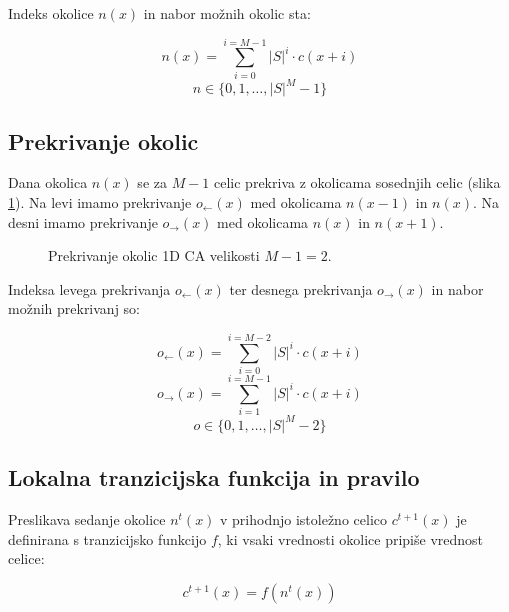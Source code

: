 \documentclass[12pt,a4paper,openany,twoside]{book}
\begin{document}
Indeks okolice \(n(x)\) in nabor možnih okolic sta:

\begin{equation}
n(x) = \sum_{i=0}^{i=M-1} |S|^i \cdot c(x+i)
\end{equation}
\begin{equation}
n \in \{0, 1, \ldots, |S|^M-1\}
\end{equation}

\subsection{Prekrivanje okolic}

Dana okolica \(n(x)\) se za \(M-1\) celic prekriva z okolicama sosednjih celic (slika \ref{overlap_1d}).
Na levi imamo prekrivanje \(o_{\leftarrow}(x)\) med okolicama \(n(x-1)\) in \(n(x)\).
Na desni imamo prekrivanje \(o_{\rightarrow}(x)\) med okolicama \(n(x)\) in \(n(x+1)\).

\begin{figure}[htb]
\centerline{}
\caption[Prekrivanje okolic 1D CA.]{Prekrivanje okolic 1D CA velikosti \(M-1=2\).}
\label{overlap_1d}
\end{figure}

Indeksa levega prekrivanja \(o_{\leftarrow}(x)\) ter desnega prekrivanja \(o_{\rightarrow}(x)\) in nabor možnih prekrivanj so:

\begin{equation}
o_{\leftarrow}(x) = \sum_{i=0}^{i=M-2} |S|^i \cdot c(x+i)
\end{equation}
\begin{equation}
o_{\rightarrow}(x) = \sum_{i=1}^{i=M-1} |S|^i \cdot c(x+i)
\end{equation}
\begin{equation}
o \in \{0, 1, \ldots, |S|^M-2\}
\end{equation}

\subsection{Lokalna tranzicijska funkcija in pravilo}

Preslikava sedanje okolice \(n^{t}(x)\) v prihodnjo istoležno celico \(c^{t+1}(x)\) je definirana
s tranzicijsko funkcijo \(f\), ki vsaki vrednosti okolice pripiše vrednost celice:

\begin{equation}
c^{t+1}(x) = f(n^{t}(x))
\end{equation}
\end{document}
